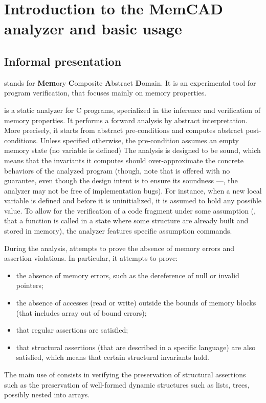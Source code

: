 \chapter{Introduction to the MemCAD analyzer and basic usage}

\section{Informal presentation}
\label{s:2:1:informal}
\memcad stands for {\bf Mem}ory {\bf C}omposite {\bf A}bstract {\bf D}omain.
It is an experimental tool for program verification, that focuses mainly
on memory properties.

\memcad is a static analyzer for C programs, specialized in the inference
and verification of memory properties.
It performs a forward analysis by abstract interpretation.
More precisely, it starts from abstract pre-conditions and computes abstract
post-conditions.
Unless specified otherwise, the pre-condition assumes an empty memory state
(no variable is defined)
The analysis is designed to be sound, which means that the invariants it
computes should over-approximate the concrete behaviors of the analyzed
program
(though, note that \memcad is offered with no guarantee, even though the
design intent is to ensure its soundness ---\eg, the analyzer may not be
free of implementation bugs).
For instance, when a new local variable is defined and before it is
uninitialized, it is assumed to hold any possible value.
To allow for the verification of a code fragment under some assumption
(\eg, that a function is called in a state where some structure are
already built and stored in memory), the analyzer features specific
assumption commands.

During the analysis, \memcad attempts to prove the absence of memory
errors and assertion violations.
In particular, it attempts to prove:
\begin{itemize}
\item the absence of memory errors, such as the dereference of null or
  invalid pointers;
\item the absence of accesses (read or write) outside the bounds of
  memory blocks (that includes array out of bound errors);
\item that regular assertions are satisfied;
\item that structural assertions (that are described in a specific
  language) are also satisfied, which means that certain structural
  invariants hold.
\end{itemize}
The main use of \memcad consists in verifying the preservation of
structural assertions such as the preservation of well-formed dynamic
structures such as lists, trees, possibly nested into arrays.

